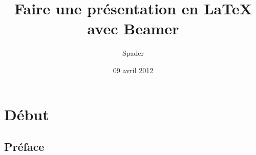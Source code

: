 \documentclass{beamer}
\title{Faire une présentation en LaTeX avec Beamer}
\author{Spader}
\institute{www.siteduzero.com}
\date{09 avril 2012}
\begin{document}
\begin{frame}
\titlepage
\end{frame}
\section{Début}
\subsection{Préface}
\end{document}
